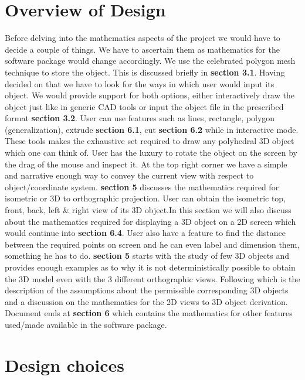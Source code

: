 \section{Overview of Design}
Before delving into the mathematics aspects of the project we would have to decide a couple of things. We have to ascertain them as mathematics for the software package would change accordingly. We use the celebrated  polygon mesh technique to store the object. This is discussed briefly in \textbf{section 3.1}. Having decided on that we have to look for the ways in which user would input its object. We would provide support for both options, either interactively draw the object just like in generic CAD tools or input the object file in the prescribed format \textbf{section 3.2}. User can use features such as lines, rectangle, polygon (generalization), extrude \textbf{section 6.1}, cut \textbf{section 6.2} while in interactive mode. These tools makes the exhaustive set required to draw any polyhedral 3D object which one can think of. User has the luxury to rotate the object on the screen by the drag of the mouse and inspect it. At the top right corner we have a simple and narrative enough way to convey the current view with respect to object/coordinate system. \textbf{section 5} discusses the mathematics required for isometric or 3D to orthographic projection. User can obtain the isometric top, front, back, left \& right view of its 3D object.In this section we will also discuss about the mathematics  required for displaying a 3D object on a 2D screen which would continue into \textbf{section 6.4}. User also have a feature to find the distance between the required points on screen and he can even label and dimension them, something he has to do. \textbf{section 5} starts with the study of few 3D objects and provides enough examples as to why it is not deterministically possible to obtain the 3D model even with the 3 different orthographic views. Following which is the description of the assumptions about the permissible corresponding 3D objects and a discussion on the mathematics for the 2D views to 3D object derivation. Document ends at \textbf{section 6} which contains the mathematics for other features used/made available in the software package.

\section{Design choices}
